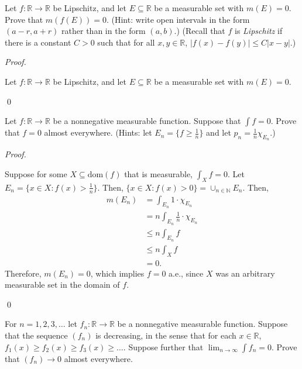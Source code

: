 \documentclass[12pt]{article}
\newenvironment{problem}[2][Problem]{\begin{trivlist}
\item[\hskip \labelsep {\bfseries #1}\hskip \labelsep {\bfseries
#2.}]}{\end{trivlist}}
\newenvironment{sol}
    {\emph{Proof.}
    }
    {
    \qed
    }
\begin{document}
\begin{problem}{3}
Let $f : \mathbb{R} \to \mathbb{R}$ be Lipschitz, and let $E \subseteq \mathbb{R}$ be a measurable set with $m(E) = 0$. Prove that $m(f(E)) = 0$. (Hint: write open intervals in the form $(a - r, a + r)$ rather than in the form $(a,b)$.) (Recall that $f$ is \textit{Lipschitz} if there is a constant $C > 0$ such that for all $x,y \in \mathbb{R}$, $\left| f(x) - f(y) \right| \leq C \left| x - y \right|$.)
\end{problem}

\begin{sol}
  Let $f : \mathbb{R} \to \mathbb{R}$ be Lipschitz, and let $E \subseteq \mathbb{R}$ be a measurable set with $m(E) = 0$.
\end{sol}

\begin{problem}{4}
Let $f : \mathbb{R} \to \mathbb{R}$ be a nonnegative measurable function. Suppose that $\int f = 0$. Prove that $f = 0$ almost everywhere. (Hints: let $E_n = \{f \geq \frac{1}{n}\}$ and let $p_n = \frac{1}{n} \chi_{E_n}$.)
\end{problem}

\begin{sol}
  Suppose for some $X \subseteq \text{dom}(f)$ that is measurable, $\int_X f = 0$. Let $E_n = \{x \in X : f(x) > \frac{1}{n}\}$. Then, $\{x \in X : f(x) > 0\} = \cup_{n \in \mathbb{N}}E_n$. Then, 
          \begin{align*}
            m(E_n) &= \int_{E_n}1 \cdot \chi_{E_n} \\
            &= n \int_{E_n} \frac{1}{n} \cdot \chi_{E_n} \\
            &\leq n \int_{E_n} f \\
            &\leq n \int_{X} f \\
            &=0.
          \end{align*}
          Therefore, $m(E_n) = 0$, which implies $f = 0$ a.e., since $X$ was an arbitrary measurable set in the domain of $f$.
\end{sol}

\begin{problem}{5}
For $n = 1,2,3,\dots$ let $f_n : \mathbb{R} \to \mathbb{R}$ be a nonnegative measurable function. Suppose that the sequence $(f_n)$ is decreasing, in the sense that for each $x \in \mathbb{R}$, $f_1(x) \geq f_2(x) \geq f_3(x) \geq \dots$. Suppose further that $\lim_{n \to \infty} \int f_n = 0$. Prove that $(f_n) \to 0$ almost everywhere.
\end{problem}
\end{document}
